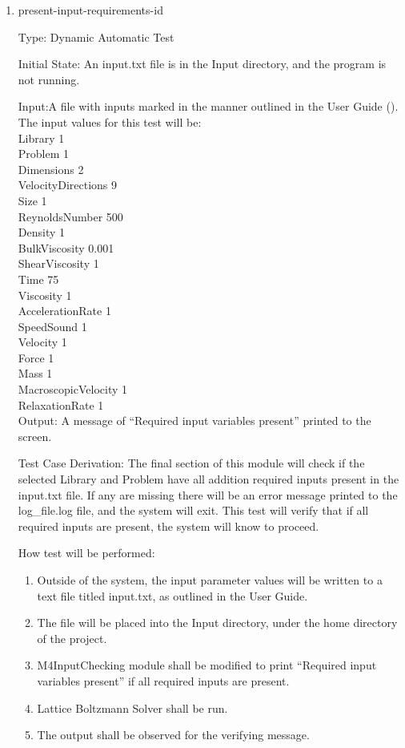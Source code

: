 \documentclass[12pt, titlepage]{article}
\newcommand{\myprogname}{Lattice Boltzmann Solver}
\newcounter{uvtestcounter} %
\begin{document}
\begin{enumerate}
	\item{present-input-requirements-id\theuvtestcounter\\}

Type: Dynamic Automatic Test

Initial State: An input.txt file is in the Input directory, and the program is not running.

Input:A file with inputs marked in the manner outlined in the
User Guide (\citet{LBM_UserGuide_PM}).\\The input values for this test will
be:\\

Library 1\\
Problem 1\\
Dimensions 2\\
VelocityDirections 9\\
Size 1\\
ReynoldsNumber 500\\
Density 1\\
BulkViscosity 0.001\\
ShearViscosity 1\\
Time 75\\
Viscosity 1\\
AccelerationRate 1\\
SpeedSound 1\\
Velocity 1\\
Force 1\\
Mass 1\\
MacroscopicVelocity 1\\
RelaxationRate 1\\

Output: A message of ``Required input variables present'' printed to the screen.

Test Case Derivation: The final section of this module will check if the selected Library and Problem have all addition required inputs present in the input.txt file. If any are missing there will be an error message printed to the log\_file.log file, and the system will exit. This test will verify that if all required inputs are present, the system will know to proceed. 

How test will be performed: 
\begin{enumerate}
	\item Outside of the system, the input parameter values will be written to a text file titled input.txt, as outlined in the User Guide.
	\item The file will be placed into the Input directory, under the home directory of the project.
	\item M4InputChecking module shall be modified to print ``Required input variables present'' if all required inputs are present.
	\item {\myprogname} shall be run. 
	\item The output shall be observed for the verifying message.
\end{enumerate}
\end{enumerate}
\end{document}
